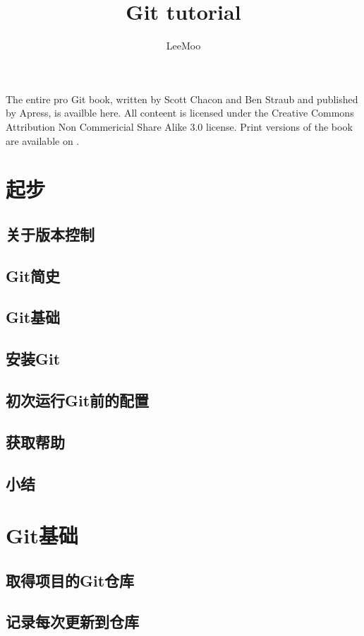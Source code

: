 \documentclass{book}
\title{\Large Git tutorial }
\author{LeeMoo}
\begin{document}
\maketitle
\tableofcontents
\subsection{}
The entire pro Git book, written by Scott Chacon and Ben Straub and published by Apress, is availble here. All conteent is licensed under the Creative Commons Attribution Non Commericial Share Alike 3.0 license. Print versions of the book are available on .\\

\chapter{起步}
	\section{关于版本控制}
	\section{Git简史}
	\section{Git基础}
	\section{安装Git}
	\section{初次运行Git前的配置}
	\section{获取帮助}
	\section{小结}

\chapter{Git基础}
	\section{取得项目的Git仓库}
	\section{记录每次更新到仓库}
\end{document}
